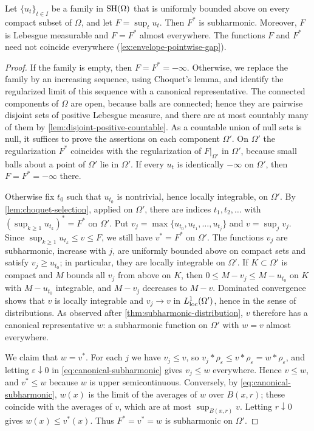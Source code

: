 \begin{theorem}\label{thm:subharmonic-envelope}
Let $\{u_t\}_{t\in I}$ be a family in $\mathrm{SH}(\Omega)$ that is uniformly bounded above on every compact subset of $\Omega$, and let $F=\sup_tu_t$. Then $F^*$ is subharmonic. Moreover, $F$ is Lebesgue measurable and $F=F^*$ almost everywhere. The functions $F$ and $F^*$ need not coincide everywhere (\cref{ex:envelope-pointwise-gap}).
\end{theorem}
\begin{proof}
If the family is empty, then $F=F^*=-\infty$. Otherwise, we replace the family by an increasing sequence, using Choquet's lemma, and identify the regularized limit of this sequence with a canonical representative. The connected components of $\Omega$ are open, because balls are connected; hence they are pairwise disjoint sets of positive Lebesgue measure, and there are at most countably many of them by \cref{lem:disjoint-positive-countable}. As a countable union of null sets is null, it suffices to prove the assertions on each component $\Omega'$. On $\Omega'$ the regularization $F^*$ coincides with the regularization of $F|_{\Omega'}$ in $\Omega'$, because small balls about a point of $\Omega'$ lie in $\Omega'$. If every $u_t$ is identically $-\infty$ on $\Omega'$, then $F=F^*=-\infty$ there.

Otherwise fix $t_0$ such that $u_{t_0}$ is nontrivial, hence locally integrable, on $\Omega'$. By \cref{lem:choquet-selection}, applied on $\Omega'$, there are indices $t_1,t_2,\ldots$ with $(\sup_{k\geq1}u_{t_k})^*=F^*$ on $\Omega'$. Put $v_j=\max\{u_{t_0},u_{t_1},\ldots,u_{t_j}\}$ and $v=\sup_jv_j$. Since $\sup_{k\geq1}u_{t_k}\leq v\leq F$, we still have $v^*=F^*$ on $\Omega'$. The functions $v_j$ are subharmonic, increase with $j$, are uniformly bounded above on compact sets and satisfy $v_j\geq u_{t_0}$; in particular, they are locally integrable on $\Omega'$. If $K\subset\Omega'$ is compact and $M$ bounds all $v_j$ from above on $K$, then $0\leq M-v_j\leq M-u_{t_0}$ on $K$ with $M-u_{t_0}$ integrable, and $M-v_j$ decreases to $M-v$. Dominated convergence shows that $v$ is locally integrable and $v_j\to v$ in $L^1_{\mathrm{loc}}(\Omega')$, hence in the sense of distributions. As observed after \cref{thm:subharmonic-distribution}, $v$ therefore has a canonical representative $w$: a subharmonic function on $\Omega'$ with $w=v$ almost everywhere.

We claim that $w=v^*$. For each $j$ we have $v_j\leq v$, so $v_j*\rho_\varepsilon\leq v*\rho_\varepsilon=w*\rho_\varepsilon$, and letting $\varepsilon\downarrow0$ in \eqref{eq:canonical-subharmonic} gives $v_j\leq w$ everywhere. Hence $v\leq w$, and $v^*\leq w$ because $w$ is upper semicontinuous. Conversely, by \eqref{eq:canonical-subharmonic}, $w(x)$ is the limit of the averages of $w$ over $B(x,r)$; these coincide with the averages of $v$, which are at most $\sup_{B(x,r)}v$. Letting $r\downarrow0$ gives $w(x)\leq v^*(x)$. Thus $F^*=v^*=w$ is subharmonic on $\Omega'$.


\end{proof}
